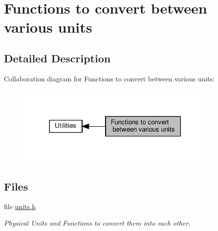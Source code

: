 \hypertarget{group__units}{}\section{Functions to convert between various units}
\label{group__units}


\subsection{Detailed Description}
Collaboration diagram for Functions to convert between various units\+:
\nopagebreak
\begin{figure}[H]
\begin{center}
\leavevmode
\includegraphics[width=281pt]{group__units}
\end{center}
\end{figure}
\subsection*{Files}
\begin{DoxyCompactItemize}
\item 
file \hyperlink{units_8h}{units.\+h}
\begin{DoxyCompactList}\small\item\em Physical Units and Functions to convert them into each other. \end{DoxyCompactList}\end{DoxyCompactItemize}
